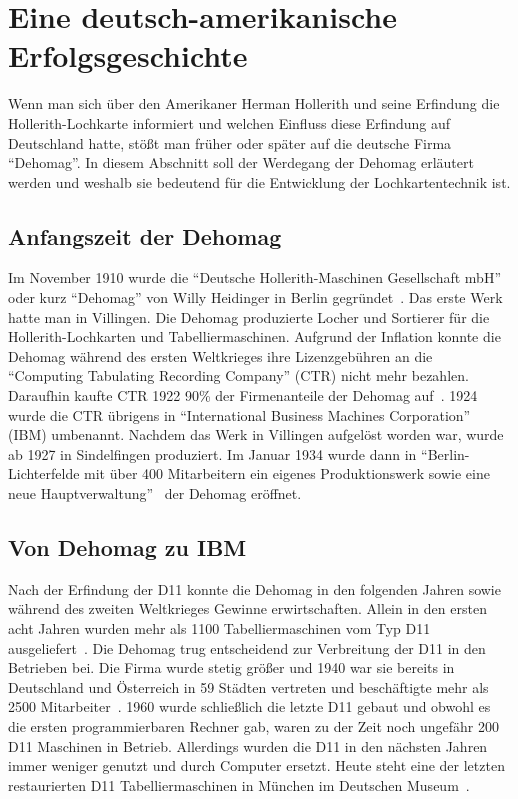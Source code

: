 \documentclass[parskip=half]{scrartcl}
\begin{document}
\section{Eine deutsch-amerikanische Erfolgsgeschichte}

Wenn man sich über den Amerikaner Herman Hollerith und seine Erfindung die
Hollerith-Lochkarte informiert und welchen Einfluss diese Erfindung auf
Deutschland hatte, stößt man früher oder später auf die deutsche Firma
\enquote{Dehomag}. In diesem Abschnitt soll der Werdegang der Dehomag erläutert
werden und weshalb sie bedeutend  für die Entwicklung der Lochkartentechnik
ist.

\subsection{Anfangszeit der Dehomag}

Im November 1910 wurde die \enquote{Deutsche Hollerith-Maschinen Gesellschaft
mbH} oder kurz \enquote{Dehomag} von Willy Heidinger in Berlin
gegründet~\cite{dingwerth}. Das erste Werk hatte man in Villingen. Die Dehomag
produzierte Locher und Sortierer für die Hollerith-Lochkarten und
Tabelliermaschinen. Aufgrund der Inflation konnte die Dehomag während des
ersten Weltkrieges ihre Lizenzgebühren an die \enquote{Computing Tabulating
Recording Company} (CTR) nicht mehr bezahlen.  Daraufhin kaufte CTR 1922 90\%
der Firmenanteile der Dehomag auf~\cite{restloseErfassung}. 1924 wurde die CTR
übrigens in \enquote{International Business Machines Corporation} (IBM)
umbenannt. Nachdem das Werk in Villingen aufgelöst worden war, wurde ab 1927 in
Sindelfingen produziert. Im Januar 1934 wurde dann in
\enquote{Berlin-Lichterfelde mit über 400 Mitarbeitern ein eigenes
Produktionswerk sowie eine neue Hauptverwaltung}~\cite{dingwerth} der Dehomag
eröffnet.

\subsection{Von Dehomag zu IBM}

Nach der Erfindung der D11 konnte die Dehomag in den folgenden Jahren sowie
während des zweiten Weltkrieges Gewinne erwirtschaften. Allein in den ersten
acht Jahren wurden mehr als 1100 Tabelliermaschinen vom Typ D11
ausgeliefert~\cite{Kist95}. Die Dehomag trug entscheidend zur Verbreitung der
D11 in den Betrieben bei. Die Firma wurde stetig größer und 1940 war sie
bereits in Deutschland und Österreich in 59 Städten vertreten und beschäftigte
mehr als 2500 Mitarbeiter~\cite{dingwerth}. 1960 wurde schließlich die
letzte D11 gebaut und obwohl es die ersten programmierbaren Rechner gab, waren
zu der Zeit noch ungefähr 200 D11 Maschinen in Betrieb. Allerdings wurden die
D11 in den nächsten Jahren immer weniger genutzt und durch Computer ersetzt.
Heute steht eine der letzten restaurierten D11 Tabelliermaschinen in München im
Deutschen Museum~\cite{Kist95}.
\end{document}
